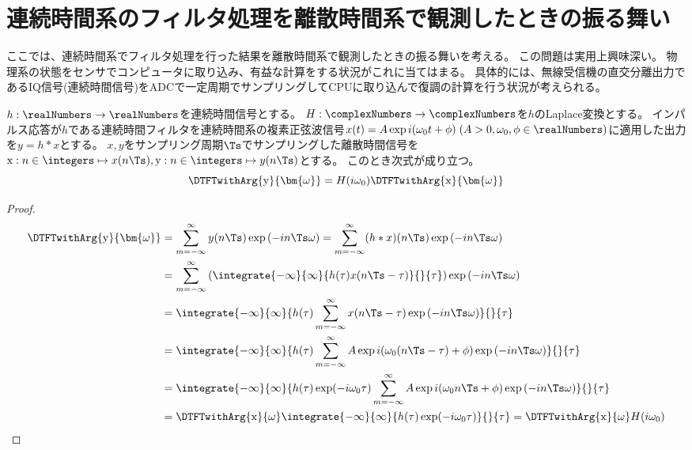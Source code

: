 \section{連続時間系のフィルタ処理を離散時間系で観測したときの振る舞い}
    ここでは、連続時間系でフィルタ処理を行った結果を離散時間系で観測したときの振る舞いを考える。
    この問題は実用上興味深い。
    物理系の状態をセンサでコンピュータに取り込み、有益な計算をする状況がこれに当てはまる。
    具体的には、無線受信機の直交分離出力であるIQ信号(連続時間信号)をADCで一定周期でサンプリングしてCPUに取り込んで復調の計算を行う状況が考えられる。
    \begin{shadebox}
        $h:\realNumbers\to\realNumbers$を連続時間信号とする。
        $H:\complexNumbers\to\complexNumbers$を$h$のLaplace変換とする。
        インパルス応答が$h$である連続時間フィルタを連続時間系の複素正弦波信号$x(t) = A\exp i(\omega_0 t + \phi)\;(A>0,\omega_0,\phi\in\realNumbers)$に適用した出力を$y=h*x$とする。
        $x,y$をサンプリング周期$\Ts$でサンプリングした離散時間信号を$\mathrm{x}: n\in\integers\mapsto x(n\Ts), \mathrm{y}: n\in\integers\mapsto y(n\Ts)$とする。
        このとき次式が成り立つ。
        \[ \DTFTwithArg{\mathrm{y}}{\bm{\omega}} = H(i\omega_0)\DTFTwithArg{\mathrm{x}}{\bm{\omega}} \]
    \end{shadebox}
    \begin{proof}
        \begin{align*}
            \DTFTwithArg{\mathrm{y}}{\bm{\omega}} &= \sum_{m=-\infty}^\infty y(n\Ts)\exp \left(-i n\Ts\omega\right) = \sum_{m=-\infty}^\infty (h*x)(n\Ts)\exp \left(-i n\Ts\omega\right) \\
            &= \sum_{m=-\infty}^\infty \left(\integrate{-\infty}{\infty}{h(\tau)x(n\Ts-\tau)}{}{\tau}\right)\exp \left(-i n\Ts\omega\right) \\
            &= \integrate{-\infty}{\infty}{h(\tau)\sum_{m=-\infty}^\infty x(n\Ts-\tau)\exp \left(-i n\Ts\omega\right)}{}{\tau} \\
            &= \integrate{-\infty}{\infty}{h(\tau)\sum_{m=-\infty}^\infty A\exp i(\omega_0 (n\Ts-\tau) + \phi)\exp \left(-i n\Ts\omega\right)}{}{\tau} \\
            &= \integrate{-\infty}{\infty}{h(\tau) \exp(-i\omega_0\tau)\sum_{m=-\infty}^\infty A\exp i(\omega_0 n\Ts + \phi)\exp \left(-i n\Ts\omega\right)}{}{\tau} \\
            &= \DTFTwithArg{\mathrm{x}}{\omega} \integrate{-\infty}{\infty}{h(\tau) \exp(-i\omega_0\tau)}{}{\tau} = \DTFTwithArg{\mathrm{x}}{\omega}H(i\omega_0)
        \end{align*}
    \end{proof}